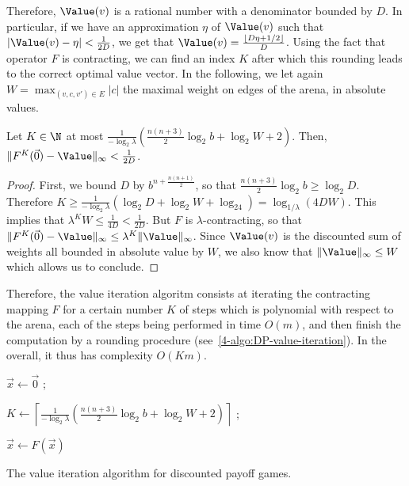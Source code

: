 Therefore, $\Value(v)$ is a rational number with a denominator bounded
by $D$. In particular, if we have an approximation $\eta$ of
$\Value(v)$ such that $|\Value(v)-\eta|<\frac 1 {2D}$, we get that
$\Value(v) = \frac{\lfloor D\eta+1/2\rfloor}D$. Using the fact that
operator $F$ is contracting, we can find an index $K$ after which this
rounding leads to the correct optimal value vector. In the following,
we let again $W = \max_{(v,c,v')\in E} |c|$ the maximal weight on edges of the arena, in
absolute values.

\begin{lemma}\label{4-lem:number-steps-VI-discounted}
  Let $K\in \N$ at most
  $\frac{1}{-\log_2\lambda} \left(\frac{n(n+3)}{2}\log_2b +
    \log_2 W+2\right)$. Then,
  $\|F^K(\vec 0)-\Value\|_\infty < \frac 1 {2D}$.
\end{lemma}
\begin{proof}
  First, we bound $D$ by $b^{n+\frac{n(n+1)}2}$, so that
  $\frac{n(n+3)}{2}\log_2b\geq \log_2D$. Therefore
  $K\geq \frac{1}{-\log_2\lambda} (\log_2D + \log_2 W+\log_24) =
  \log_{1/\lambda}(4DW)$. This implies that
  $\lambda^KW\leq \frac{1}{4D}< \frac 1 {2D}$. But $F$ is
  $\lambda$-contracting, so that
  $\|F^K(\vec 0)-\Value\|_\infty\leq
  \lambda^K\|\Value\|_\infty$. Since $\Value(v)$ is the discounted sum
  of weights all bounded in absolute value by $W$, we also know that
  $\|\Value\|_\infty\leq W$ which allows us to conclude.
\end{proof}

Therefore, the value iteration algoritm consists at iterating the
contracting mapping $F$ for a certain number $K$ of steps which is
polynomial with respect to the arena, each of the steps being
performed in time $O(m)$, and then finish the computation by a
rounding procedure (see~\cref{4-algo:DP-value-iteration}). In the
overall, it thus has complexity $O(K m)$.

\begin{algorithm}

 $\vec x \leftarrow \vec 0$ ;

 $K \leftarrow \left\lceil \frac{1}{-\log_2\lambda} \left(\frac{n(n+3)}{2}\log_2b +
     \log_2 W+2\right) \right\rceil$ ;

 {
   $\vec x \leftarrow F(\vec x)$
 }

\caption{The value iteration algorithm for discounted payoff games.}
\label{4-algo:DP-value-iteration}
\end{algorithm}

